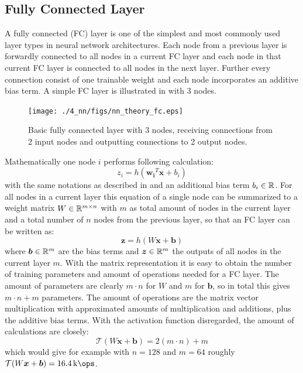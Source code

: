 
\subsection{Fully Connected Layer}
A fully connected (FC) layer is one of the simplest and most commonly used layer types in neural network architectures.
Each node from a previous layer is forwardly connected to all nodes in a current FC layer and each node in that current FC layer is connected to all nodes in the next layer.
Further every connection consist of one trainable weight and each node incorporates an additive bias term.
A simple FC layer is illustrated in  with 3 nodes.
\begin{figure}[!ht]
  \centering
    \texttt{[image: ./4\_nn/figs/nn\_theory\_fc.eps]}
  \caption{Basic fully connected layer with 3 nodes, receiving connections from 2 input nodes and outputting connections to 2 output nodes.}
  \label{fig:nn_theory_fc}
\end{figure}
\FloatBarrier
\noindent
Mathematically one node $i$ performs following calculation:
\begin{equation}
  z_i = h(\bm{w_i}^T \bm{x} + b_i)
\end{equation}
with the same notations as described in  and an additional bias term $b_i \in \mathbb{R}$.
For all nodes in a current layer this equation of a single node can be summarized to a weight matrix $W \in \mathbb{R}^{m \times n}$ with $m$ as total amount of nodes in the current layer and a total number of $n$ nodes from the previous layer, so that an FC layer can be written as:
\begin{equation}
  \bm{z} = h(W \bm{x} + \bm{b})
\end{equation}
where $\bm{b} \in \mathbb{R}^m$ are the bias terms and $\bm{z} \in \mathbb{R}^m$ the outputs of all nodes in the current layer $m$.
With the matrix representation it is easy to obtain the number of training parameters and amount of operations needed for a FC layer.
The amount of parameters are clearly $m \cdot n$ for $W$ and $m$ for $\bm{b}$, so in total this gives $m \cdot n + m$ parameters.
The amount of operations are the matrix vector multiplication with approximated amounts of multiplication and additions, plus the additive bias terms.
With the activation function disregarded, the amount of calculations are closely:
\begin{equation} 
  \mathcal{T}(W \bm{x} + \bm{b}) = 2 (m \cdot n) + m
\end{equation}
which would give for example with $n = 128$ and $m = 64$ roughly $\mathcal{T}(W \bm{x} + \bm{b}) = \SI{16.4}{\kilo\ops}$.



